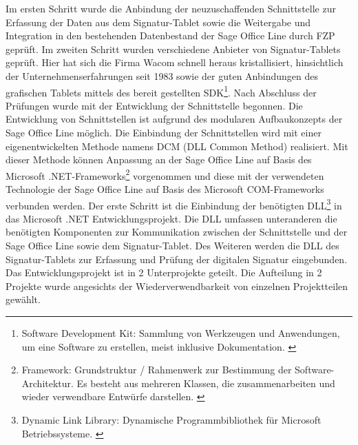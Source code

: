 Im ersten Schritt wurde die Anbindung der neuzuschaffenden Schnittstelle zur Erfassung der Daten aus dem Signatur-Tablet sowie die 
Weitergabe und Integration in den bestehenden Datenbestand der Sage Office Line durch FZP geprüft. Im zweiten Schritt wurden verschiedene
Anbieter von Signatur-Tablets geprüft. Hier hat sich die Firma Wacom schnell heraus kristallisiert, hinsichtlich der Unternehmenserfahrungen seit 1983 \cite{konzept1} sowie der guten Anbindungen des grafischen Tablets mittels des bereit gestellten SDK\footnote{\label{foot:4}Software Development Kit: Sammlung von Werkzeugen und Anwendungen, um eine Software zu erstellen, meist inklusive Dokumentation. \cite{SDK}}. Nach Abschluss der Prüfungen wurde mit der Entwicklung der Schnittstelle begonnen.
\newline
Die Entwicklung von Schnittstellen ist aufgrund des modularen Aufbaukonzepts der Sage Office Line möglich. Die Einbindung der Schnittstellen wird mit einer eigenentwickelten Methode namens DCM (DLL Common Method) realisiert. Mit dieser Methode können Anpassung an der Sage Office Line auf Basis des Microsoft .NET-Frameworks\footnote{\label{foot:5}Framework: Grundstruktur / Rahmenwerk zur Bestimmung der 
Software-Architektur. Es besteht aus mehreren Klassen, die zusammenarbeiten und wieder verwendbare Entwürfe darstellen. \cite{framework}}
vorgenommen und diese mit der verwendeten Technologie der Sage Office Line auf Basis des Microsoft COM-Frameworks verbunden werden.
\newline
Der erste Schritt ist die Einbindung der benötigten DLL\footnote{\label{foot:6}Dynamic Link Library: Dynamische Programmbibliothek für Microsoft Betriebssysteme. \cite{DLL}} in das Microsoft .NET Entwicklungsprojekt. Die DLL umfassen unteranderen die benötigten Komponenten zur Kommunikation zwischen der Schnittstelle und der Sage Office Line sowie dem Signatur-Tablet. Des Weiteren werden die DLL des Signatur-Tablets zur Erfassung und Prüfung der digitalen Signatur eingebunden. Das Entwicklungsprojekt ist in 2 Unterprojekte geteilt. Die Aufteilung in 2 Projekte wurde angesichts der Wiederverwendbarkeit von einzelnen Projektteilen gewählt.
\newline
